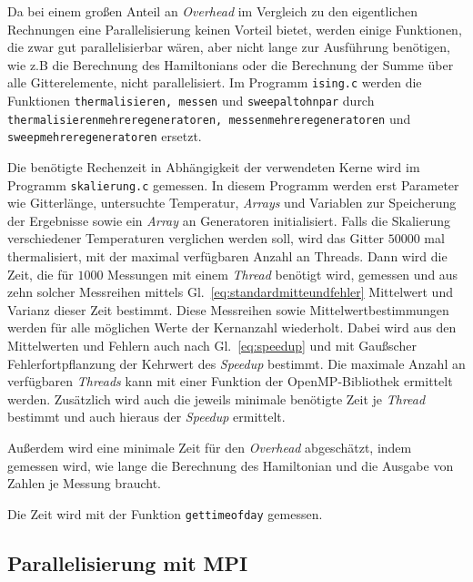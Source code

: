 	
	Da bei einem großen Anteil an \textit{Overhead} im Vergleich zu den eigentlichen Rechnungen eine Parallelisierung keinen Vorteil bietet, werden einige Funktionen, die zwar gut parallelisierbar wären, aber nicht lange zur Ausführung benötigen, wie z.B die Berechnung des Hamiltonians oder die Berechnung der Summe über alle Gitterelemente, nicht parallelisiert. Im Programm \texttt{ising.c} werden die Funktionen \texttt{thermalisieren, messen} und \texttt{sweepaltohnpar} durch \texttt{thermalisierenmehreregeneratoren, messenmehreregeneratoren} und \\ \texttt{sweepmehreregeneratoren} ersetzt.
	
	Die benötigte Rechenzeit in Abhängigkeit der verwendeten Kerne wird im Programm \texttt{skalierung.c} gemessen. In diesem Programm werden erst Parameter wie Gitterlänge, untersuchte Temperatur, \textit{Arrays} und Variablen zur Speicherung der Ergebnisse sowie ein \textit{Array} an Generatoren initialisiert. Falls die Skalierung verschiedener Temperaturen verglichen werden soll, wird das Gitter $50000$ mal thermalisiert, mit der maximal verfügbaren Anzahl an Threads. Dann wird die Zeit, die für $\num{1000}$ Messungen mit einem \textit{Thread} benötigt wird, gemessen und aus zehn solcher Messreihen mittels Gl.~\ref{eq:standardmitteundfehler} Mittelwert und Varianz dieser Zeit bestimmt. Diese Messreihen sowie Mittelwertbestimmungen werden für alle möglichen Werte der Kernanzahl wiederholt. Dabei wird aus den Mittelwerten und Fehlern auch nach Gl.~\ref{eq:speedup} und mit Gaußscher Fehlerfortpflanzung der Kehrwert des \textit{Speedup} bestimmt. Die maximale Anzahl an verfügbaren \textit{Threads} kann mit einer Funktion der OpenMP-Bibliothek ermittelt werden. 
	Zusätzlich wird auch die jeweils minimale benötigte Zeit je \textit{Thread} bestimmt und auch hieraus der \textit{Speedup} ermittelt.
	
	Außerdem wird eine minimale Zeit für den \textit{Overhead} abgeschätzt, indem gemessen wird, wie lange die Berechnung des Hamiltonian und die Ausgabe von Zahlen je Messung braucht. 
	
	Die Zeit wird mit der Funktion \texttt{gettimeofday} gemessen.
	
	\subsection{Parallelisierung mit MPI}
	\label{subsec:parmpi}
	
